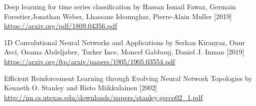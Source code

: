 \documentclass{article}
\begin{document}
\begin{thebibliography}{9}


  Deep learning for time series classification by Hassan Ismail Fawaz, Germain Forestier,Jonathan Weber, Lhassane Idoumghar, Pierre-Alain Muller [2019]
  \url{https://arxiv.org/pdf/1809.04356.pdf}

  1D Convolutional Neural Networks and Applications by Serkan Kiranyaz, Onur Avci, Osama Abdeljaber, Turker Ince, Moncef Gabbouj, Daniel J. Inman [2019]
  \url{https://arxiv.org/ftp/arxiv/papers/1905/1905.03554.pdf}

  Efficient Reinforcement Learning through Evolving Neural Network Topologies by Kenneth O. Stanley and Risto Miikkulainen [2002]
  \url{http://nn.cs.utexas.edu/downloads/papers/stanley.gecco02_1.pdf}

\end{thebibliography}
\end{document}
